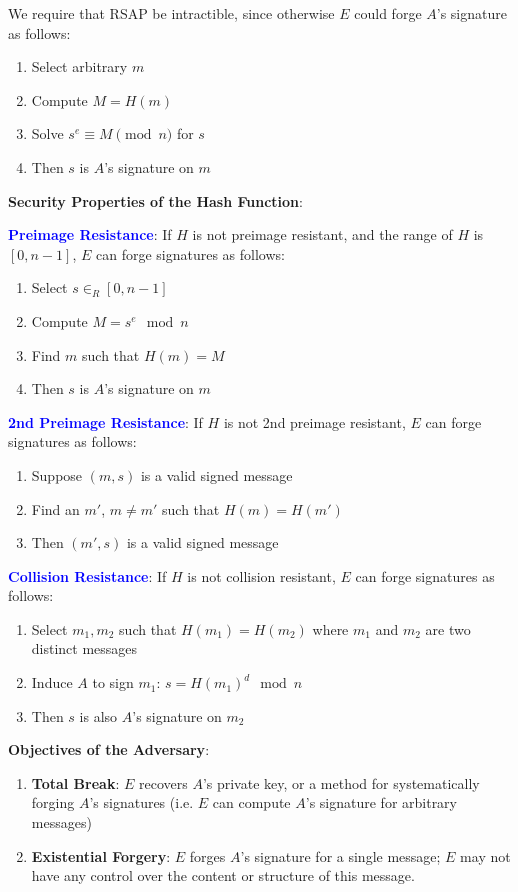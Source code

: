 \documentclass[12pt,titlepage]{article}
\begin{document}
We require that RSAP be intractible, since otherwise $E$ could forge $A$'s signature as follows: \begin{enumerate}
	\item Select arbitrary $m$
	\item Compute $M = H(m)$
	\item Solve $s^e \equiv M \pmod n$ for $s$
	\item Then $s$ is $A$'s signature on $m$
\end{enumerate}

\textbf{Security Properties of the Hash Function}: 

\textbf{\textcolor{blue}{Preimage Resistance}}: If $H$ is not preimage resistant, and the range of $H$ is $[0, n-1]$, $E$ can forge signatures as follows: \begin{enumerate}
	\item Select $s \in_R [0,n-1]$
	\item Compute $M = s^e \mod n$
	\item Find $m$ such that $H(m) = M$
	\item Then $s$ is $A$'s signature on $m$
\end{enumerate}

\textbf{\textcolor{blue}{2nd Preimage Resistance}}: If $H$ is not 2nd preimage resistant, $E$ can forge signatures as follows: \begin{enumerate}
	\item Suppose $(m,s)$ is a valid signed message
	\item Find an $m'$, $m \neq m'$ such that $H(m) = H(m')$
	\item Then $(m', s)$ is a valid signed message
\end{enumerate}

\textbf{\textcolor{blue}{Collision Resistance}}: If $H$ is not collision resistant, $E$ can forge signatures as follows: \begin{enumerate}
	\item Select $m_1, m_2$ such that $H(m_1) = H(m_2)$ where $m_1$ and $m_2$ are two distinct messages
	\item Induce $A$ to sign $m_1$: $s = H(m_1)^d \mod n$
	\item Then $s$ is also $A$'s signature on $m_2$
\end{enumerate}

\textbf{Objectives of the Adversary}: 
\begin{enumerate}
	\item \textbf{Total Break}: $E$ recovers $A$'s private key, or a method for systematically forging $A$'s signatures (i.e. $E$ can compute $A$'s signature for arbitrary messages)
	\item \textbf{Existential Forgery}: $E$ forges $A$'s signature for a single message; $E$ may not have any control over the content or structure of this message. 
\end{enumerate}
\end{document}
